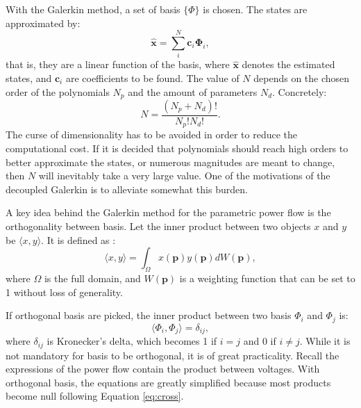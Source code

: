 With the Galerkin method, a set of basis $\{\Phi\}$ is chosen. The states are approximated by:
\begin{equation}
   \bm{\hat{x}} = \sum_i^N \bm{c}_i \bm{\Phi}_i,
   \label{eq:apr}
\end{equation}
that is, they are a linear function of the basis, where $\bm{\hat{x}}$ denotes the estimated states, and $\bm{c}_i$ are coefficients to be found. The value of $N$ depends on the chosen order of the polynomials $N_p$ and the amount of parameters $N_d$. Concretely:
\begin{equation}
   N = \frac{(N_p + N_d)!}{N_p! N_d!}.
\end{equation}
The curse of dimensionality has to be avoided in order to reduce the computational cost. If it is decided that polynomials should reach high orders to better approximate the states, or numerous magnitudes are meant to change, then $N$ will inevitably take a very large value. One of the motivations of the decoupled Galerkin is to alleviate somewhat this burden. 

A key idea behind the Galerkin method for the parametric power flow is the orthogonality between basis. Let the inner product between two objects $x$ and $y$ be $\langle x,y \rangle$. It is defined as \cite{zhou2019global}:
\begin{equation}
   \langle x,y \rangle = \int_\Omega x(\bm{p}) y(\bm{p}) dW(\bm{p}),
\end{equation}
where $\Omega$ is the full domain, and $W(\bm{p})$ is a weighting function that can be set to 1 without loss of generality.

If orthogonal basis are picked, the inner product between two basis $\Phi_i$ and $\Phi_j$ is:
\begin{equation}
   \langle \Phi_i, \Phi_j \rangle = \delta_{ij},
   \label{eq:cross}
\end{equation}
where $\delta_{ij}$ is Kronecker's delta, which becomes 1 if $i=j$ and 0 if $i\neq j$. While it is not mandatory for basis to be orthogonal, it is of great practicality. Recall the expressions of the power flow contain the product between voltages. With orthogonal basis, the equations are greatly simplified because most products become null following Equation \ref{eq:cross}.

